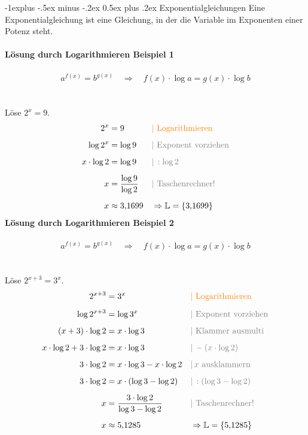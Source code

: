 \documentclass[a4paper,10pt]{article}
\makeatletter
\renewcommand{\subsection}{\@startsection{subsection}{2}{0mm}%
                                {-1explus -.5ex minus -.2ex}%
                                {0.5ex plus .2ex}%
                                {\normalfont\normalsize\bfseries}}
\makeatother
\begin{document}
\begin{multicols}{3}
    \subsection{Exponential­gleichungen}
    Eine Exponentialgleichung ist eine Gleichung, in der die Variable im Exponenten einer Potenz steht. \\~\\
    \textbf{Lösung durch Logarithmieren Beispiel 1}\\~\\
    \[a^{f(x)} = b^{g(x)} \quad \Rightarrow \quad f(x) \cdot \log a = g(x) \cdot \log b\]\\~\\
    Löse $2^x = 9$.\\
    \begin{align*} 2^x &= 9 &&{\color{orange}| \text{ Logarithmieren}} \\[5px] \log 2^x &= \log 9 &&{\color{gray}| \text{ Exponent vorziehen}} \\[5px] x \cdot \log 2 &= \log 9 &&{\color{gray}|\, :\log 2} \\[5px] x &= \frac{\log 9}{\log 2} &&{\color{gray}| \text{ Taschenrechner!}} \\[5px] x &\approx 3{,}1699 && \Rightarrow \mathbb{L} = \{3{,}1699\} \end{align*}
    \textbf{Lösung durch Logarithmieren Beispiel 2}\\~\\
    \[a^{f(x)} = b^{g(x)} \quad \Rightarrow \quad f(x) \cdot \log a = g(x) \cdot \log b\]\\~\\
    Löse $2^{x+3} = 3^x$. \\
    \begin{align*} 2^{x+3} &= 3^x &&{\color{orange}| \text{ Logarithmieren}} \\[5px] \log 2^{x+3} &= \log 3^x &&{\color{gray}| \text{ Exponent vorziehen}} \\[5px] (x+3) \cdot \log 2 &= x \cdot \log 3 &&{\color{gray}| \text{ Klammer ausmulti}} \\[5px] x \cdot \log 2 + 3 \cdot \log 2 &= x \cdot \log 3 &&{\color{gray}|\, -(x \cdot \log 2)} \\[5px] 3 \cdot \log 2 &= x \cdot \log 3 - x \cdot \log 2 &&{\color{gray}|\, x \text{ ausklammern}} \\[5px] 3 \cdot \log 2 &= x \cdot (\log 3 - \log 2) &&{\color{gray}|\, : (\log 3 - \log 2)} \\[5px] x &= \frac{3 \cdot \log 2}{\log 3 - \log 2} &&{\color{gray}| \text{ Taschenrechner!}} \\[5px] x &\approx 5{,}1285 && \Rightarrow \mathbb{L} = \{5{,}1285\} \end{align*}

\end{multicols}
\end{document}

